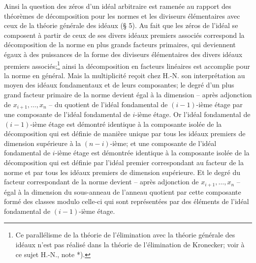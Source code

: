 Ainsi la question des zéros d'un idéal arbitraire est ramenée au rapport des théorèmes de décomposition pour les normes et les diviseurs élémentaires avec ceux de la théorie générale des idéaux (\S{} 5). Au fait que les zéros de l'idéal se composent à partir de ceux de ses divers idéaux premiers associés correspond la décomposition de la norme en plus grands facteurs primaires, qui deviennent égaux à des puissances de la forme des diviseurs élémentaires des divers idéaux premiers associés;\footnote{Ce parallélisme de la théorie de l'élimination avec la théorie générale des idéaux n'est pas réalisé dans la théorie de l'élimination de Kronecker; voir à ce sujet H.-N., note *).} ainsi la décomposition en facteurs linéaires est accomplie pour la norme en général. Mais la multiplicité reçoit chez H.-N. son interprétation au moyen des idéaux fondamentaux et de leurs composantes; le degré d'un plus grand facteur primaire de la norme devient égal à la dimension -- après adjonction de $x_{i+1},\ldots,x_n$ -- du quotient de l'idéal fondamental de $(i-1)$-ième étage par une composante de l'idéal fondamental de $i$-ième étage. Or l'idéal fondamental de $(i-1)$-ième étage est démontré identique à la composante isolée de la décomposition qui est définie de manière unique par tous les idéaux premiers de dimension supérieure à la $(n-i)$-ième; et une composante de l'idéal fondamental de $i$-ième étage est démontrée identique à la composante isolée de la décomposition qui est définie par l'idéal premier correspondant au facteur de la norme et par tous les idéaux premiers de dimension supérieure. Et le degré du facteur correspondant de la norme devient -- après adjonction de $x_{i+1},\ldots,x_n$ -- égal à la dimension du sous-anneau de l'anneau quotient par cette composante formé des classes modulo celle-ci qui sont représentées par des éléments de l'idéal fondamental de $(i-1)$-ième étage.

